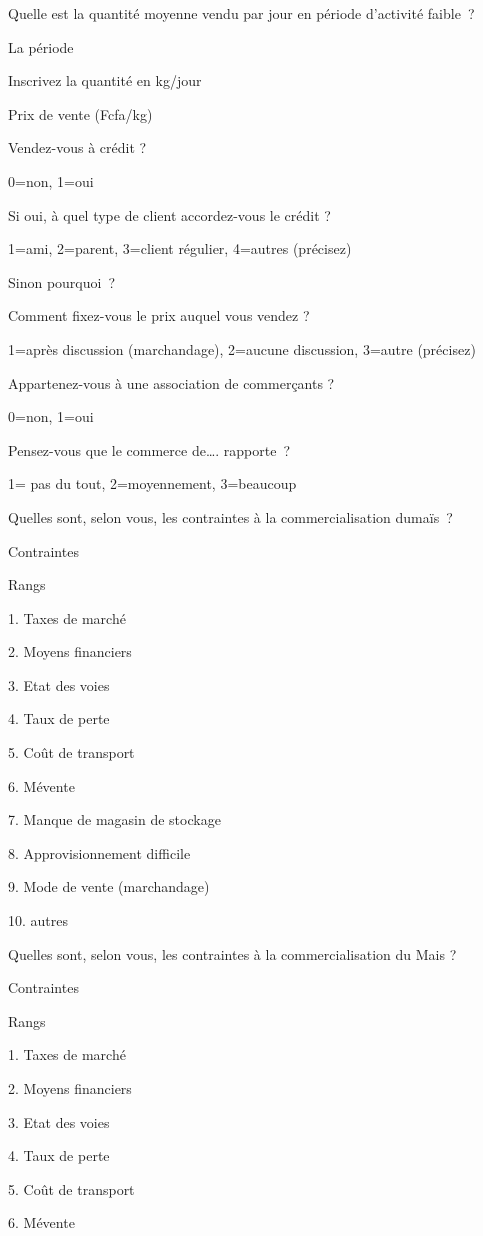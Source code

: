 \documentclass[12pt,oneside]{report}
\begin{document}
Quelle est la quantité moyenne vendu par jour en période d’activité faible ?

La période

Inscrivez la quantité en kg/jour

Prix de vente (Fcfa/kg)

Vendez-vous à crédit ?

0=non, 1=oui

Si oui, à quel type de client accordez-vous le crédit ?

1=ami, 2=parent, 3=client régulier, 4=autres (précisez)

Sinon pourquoi ?

Comment fixez-vous le prix auquel vous vendez ?

1=après discussion (marchandage), 2=aucune discussion, 3=autre (précisez)

Appartenez-vous à une association de commerçants ?

0=non, 1=oui

Pensez-vous que le commerce de…. rapporte ?

1= pas du tout, 2=moyennement, 3=beaucoup

Quelles sont, selon vous, les contraintes à la commercialisation dumaïs ?

Contraintes

Rangs

1. Taxes de marché

2. Moyens financiers

3. Etat des voies

4. Taux de perte

5. Coût de transport

6. Mévente

7. Manque de magasin de stockage

8. Approvisionnement difficile

9. Mode de vente (marchandage)

10. autres

Quelles sont, selon vous, les contraintes à la commercialisation du Mais ?

Contraintes

Rangs

1. Taxes de marché

2. Moyens financiers

3. Etat des voies

4. Taux de perte

5. Coût de transport

6. Mévente
\end{document}
